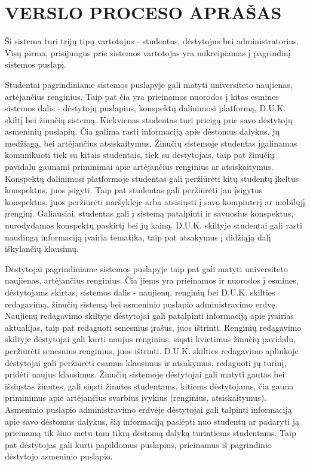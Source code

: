 \documentclass{VUMIFPSkursinis}
\begin{document}
\section{VERSLO PROCESO APRAŠAS}

Ši sistema turi trijų tipų vartotojus - studentus, dėstytojus bei administratorius. Visų pirma, prisijungus prie sistemos vartotojas yra nukreipiamas į pagrindinį sistemos puslapį.

Studentai pagrindiniame sistemos puslapyje gali matyti universiteto naujienas, artėjančius renginius. Taip pat čia yra prieinamos nuorodos į kitas esmines sistemos dalis - dėstytojų puslapius, konspektų dalinimosi platformą, D.U.K. skiltį bei žinučių sistemą. Kiekvienas studentas turi prieigą prie savo dėstytojų asmeninių puslapių. Čia galima rasti informaciją apie dėstomus dalykus, jų medžiagą, bei artėjančius atsiskaitymus. Žinučių sistemoje studentas įgalinamas komunikuoti tiek su kitais studentais, tiek su dėstytojais, taip pat žinučių pavidalu gaunami priminimai apie artėjančius renginius ar atsiskaitymus. Konspektų dalinimosi platformoje studentas gali peržiūrėti kitų studentų įkeltus konspektus, juos įsigyti. Taip pat studentas gali peržiūrėti jau įsigytus konspektus, juos peržiūrėti naršyklėje arba atsisiųsti į savo kompiuterį ar mobilųjį įrenginį. Galiausiai, studentas gali į sistemą patalpinti ir savuosius konspektus, nurodydamas konspektų paskirtį bei jų kainą. D.U.K. skiltyje studentai gali rasti naudingą informaciją įvairia tematika, taip pat atsakymus į didžiąją dalį iškylančių klausimų.

Dėstytojai pagrindiniame sistemos puslapyje taip pat gali matyti universiteto naujienas, artėjančius renginius. Čia jiems yra prieinamos ir nuorodos į esmines, dėstytojams skirtas, sistemos dalis - naujienų, renginių bei D.U.K. skilties redagavimą, žinučių sistemą bei asmeninio puslapio administravimo erdvę. Naujienų redagavimo skiltyje dėstytojai gali patalpinti informaciją apie įvairias aktualijas, taip pat redaguoti senesnius įrašus, juos ištrinti. Renginių redagavimo skiltyje dėstytojai gali kurti naujus renginius, siųsti kvietimus žinučių pavidalu, peržiūrėti senesnius renginius, juos ištrinti. D.U.K. skilties redagavimo aplinkoje dėstytojai gali peržiūrėti esamus klausimus ir atsakymus, redaguoti jų turinį, pridėti naujus klausimus. Žinučių sistemoje dėstytojai gali matyti gautas bei išsiųstas žinutes, gali siųsti žinutes studentams, kitiems dėstytojams, čia gauna priminimus apie artėjančius svarbius įvykius (renginius, atsiskaitymus). Asmeninio puslapio administravimo erdvėje dėstytojai gali talpinti informaciją apie savo dėstomus dalykus, šią informaciją paslėpti nuo studentų ar padaryti ją prieinamą tik šiuo metu tam tikrą dėstomą dalyką turintiems studentams. Taip pat dėstytojas gali kurti papildomus puslapius, prieinamus iš pagrindinio dėstytojo asmeninio puslapio.
\end{document}
